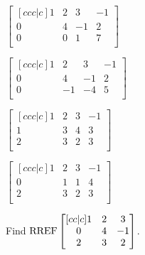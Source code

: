 \documentclass{article}
\begin{document}
\begin{readinessAssuranceTest}
  \begin{multicols}{4}
  \begin{readinessAssuranceTestChoices}
  \item
    \(
      \begin{bmatrix}[ccc|c]
        1 & 2 & 3 & -1 \\
        0 & 4 & -1 & 2 \\
        0 & 0 & 1 & 7\\
      \end{bmatrix}
    \)
  \item
    \(
      \begin{bmatrix}[ccc|c]
        1 & 2 & 3 & -1 \\
        0 & 4 & -1 & 2 \\
        0 & -1 & -4 & 5 \\
      \end{bmatrix}
    \) %
  \item
    \(
      \begin{bmatrix}[ccc|c]
        1 & 2 & 3 & -1 \\
        1 & 3 & 4 & 3 \\
        2 & 3 & 2 & 3\\
      \end{bmatrix}
    \)
  \item
    \(
      \begin{bmatrix}[ccc|c]
        1 & 2 & 3 & -1 \\
        0 & 1 & 1 & 4 \\
        2 & 3 & 2 & 3 \\
      \end{bmatrix}
    \)
  \end{readinessAssuranceTestChoices}
  \end{multicols}

\item Find
  \(\operatorname{RREF}
    \begin{bmatrix}[cc|c]
      1 & 2 & 3 \\
      0 & 4 & -1 \\
      2 & 3 & 2 \\
    \end{bmatrix}
  \).


\end{readinessAssuranceTest}
\end{document}

